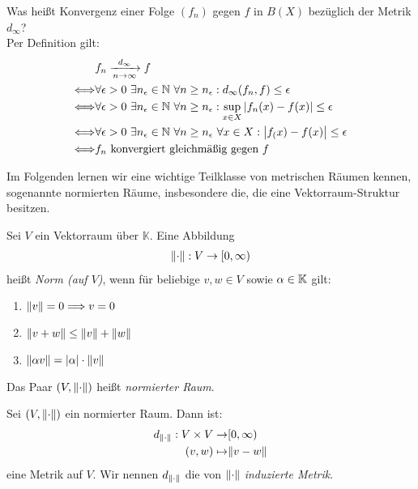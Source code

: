 \begin{Beispiel}{
	Was heißt Konvergenz einer Folge $(f_n)$ gegen $f$ in $B(X)$ bezüglich der 
	Metrik $d_\infty$?\\
	Per Definition gilt:
	\begin{align*}
		& f_n \xrightarrow[n \to \infty]{d_\infty} f \\
		\Longleftrightarrow & \forall \epsilon > 0 \text{ } \exists n_\epsilon \in \mathbb{N} \text{ }\forall n \geq 
			n_\epsilon: d_\infty(f_n,f) \leq \epsilon \\
		\Longleftrightarrow & \forall \epsilon > 0 \text{ } \exists n_\epsilon \in \mathbb{N} \text{ }
			\forall n \geq  n_\epsilon: \sup_{x \in X} \abs{f_n(x)-f(x)} \leq 
			\epsilon \\
		\Longleftrightarrow & \forall \epsilon > 0 \text{ } \exists n_\epsilon \in 
			\mathbb{N} \text{ }\forall n \geq n_\epsilon \text{ }\forall x \in X: 
			\abs{f_(x) -f(x)} \leq \epsilon \\
		\Longleftrightarrow & f_n \text{ konvergiert gleichmäßig gegen } f
	\end{align*}
}\end{Beispiel}

Im Folgenden lernen wir eine wichtige Teilklasse von metrischen Räumen kennen, sogenannte
normierten Räume, insbesondere die, die eine Vektorraum-Struktur besitzen.

\begin{Definition}{%
	Sei $V$ ein Vektorraum über $\mathbb{K}$. Eine Abbildung 
	\begin{align*}
		\norm{\cdot} : V \rightarrow [0, \infty)
	\end{align*}
	heißt \emph{Norm (auf $V$)}, wenn für beliebige $v,w\in V$ sowie $\alpha \in \mathbb{K}$ gilt:
	\begin{enumerate}[label=\subscript{N}{{\arabic*}}]
		\item \label{def:norm:1} $\norm{v} = 0 \Longrightarrow v = 0$
		\item \label{def:norm:2} $ \norm{v + w} \leq \norm{v} + \norm{w}$
		\item \label{def:norm:3} $\norm{\alpha v} = \abs{\alpha}\cdot\norm{v}$
	\end{enumerate}
	Das Paar $(V, \norm{\cdot})$ heißt \emph{normierter Raum}.
}\end{Definition}

\begin{Definition}{%
	Sei $(V, \norm{\cdot})$ ein normierter Raum. Dann ist:
	\begin{align*}
		d_{\norm{\cdot}} : V \times V \to & [0, \infty) \\
			(v,w) \mapsto & \norm{v-w}
	\end{align*}
	eine Metrik auf $V$. Wir nennen $d_{\norm{\cdot}}$ die von $\norm{\cdot}$ 
	\emph{induzierte Metrik}.
}\end{Definition}

